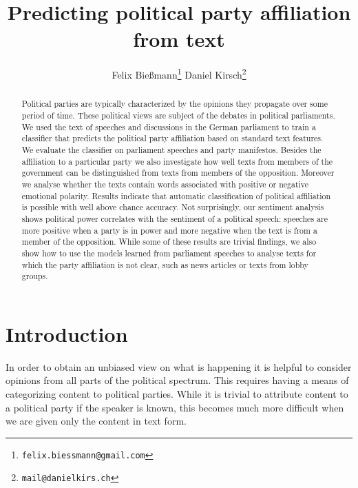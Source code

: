 \documentclass{article} %
\title{Predicting political party affiliation from text}
\author{
Felix Bie\ss{}mann\thanks{\texttt{felix.biessmann@gmail.com}}
\And
Daniel Kirsch\thanks{\texttt{mail@danielkirs.ch}}
}
\begin{document}
\maketitle

\begin{abstract}
Political parties are typically characterized by the opinions they propagate over some period of time. These political views are subject of the debates in political parliaments. We used the text of speeches and discussions in the German parliament to train a classifier that predicts the political party affiliation based on standard text features. We evaluate the classifier on parliament speeches and party manifestos. Besides the affiliation to a particular party we also investigate how well texts from members of the government can be distinguished from texts from members of the opposition. Moreover we analyse whether the texts contain words associated with positive or negative emotional polarity. Results indicate that automatic classification of political affiliation is possible with well above chance accuracy. Not surprisingly, our sentiment analysis shows political power correlates with the sentiment of a political speech: speeches are more positive when a party is in power and more negative when the text is from a member of the opposition. While some of these results are trivial findings, we also show how to use the models learned from parliament speeches to analyse texts for which the party affiliation is not clear, such as news articles or texts from lobby groups. 
\end{abstract}

\section{Introduction}


In order to obtain an unbiased view on what is happening it is helpful to consider opinions from all parts of the political spectrum. This requires having a means of categorizing content to political parties. While it is trivial to attribute content to a political party if the speaker is known, this becomes much more difficult when we are given only the content in text form. 
\end{document}
